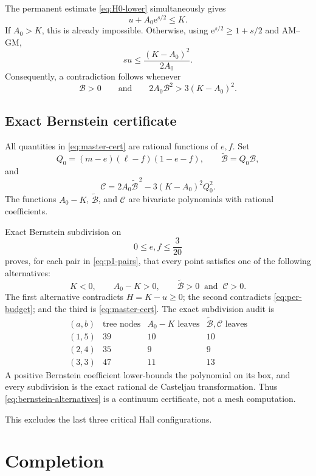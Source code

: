 \documentclass[11pt]{article}
\theoremstyle{definition}
\newcommand{\e}{\mathrm e}
\begin{document}
The permanent estimate \eqref{eq:H0-lower} simultaneously gives
\[
 u+A_0\e^{s/2}\le K.
 \tag{5.17}\label{eq:per-budget}
\]
If $A_0>K$, this is already impossible.  Otherwise, using $\e^{s/2}\ge1+s/2$ and AM--GM,
\[
 su\le\frac{(K-A_0)^2}{2A_0}.
 \tag{5.18}\label{eq:su-upper}
\]
Consequently, a contradiction follows whenever
\[
 \mathcal B>0
 \qquad\text{and}\qquad
 2A_0\mathcal B^2>3(K-A_0)^2.
 \tag{5.19}\label{eq:master-cert}
\]

\subsection{Exact Bernstein certificate}

All quantities in \eqref{eq:master-cert} are rational functions of $e,f$.  Set
\[
 Q_0=(m-e)(\ell-f)(1-e-f),
 \qquad
 \widetilde{\mathcal B}=Q_0\mathcal B,
\]
and
\[
 \mathcal C
 =2A_0\widetilde{\mathcal B}^{\,2}
 -3(K-A_0)^2Q_0^2.
 \tag{5.20}\label{eq:Cpoly}
\]
The functions $A_0-K$, $\widetilde{\mathcal B}$, and $\mathcal C$ are bivariate polynomials with rational coefficients.

Exact Bernstein subdivision on
\[
 0\le e,f\le\frac3{20}
\]
proves, for each pair in \eqref{eq:p1-pairs}, that every point satisfies one of the following alternatives:
\[
 K<0,
 \qquad A_0-K>0,
 \qquad
 \widetilde{\mathcal B}>0\ \text{ and }\ \mathcal C>0.
 \tag{5.21}\label{eq:bernstein-alternatives}
\]
The first alternative contradicts $H=K-u\ge0$; the second contradicts \eqref{eq:per-budget}; and the third is \eqref{eq:master-cert}.  The exact subdivision audit is
\[
\begin{array}{c|ccc}
 (a,b)&\text{tree nodes}&A_0-K\text{ leaves}&
 \widetilde{\mathcal B},\mathcal C\text{ leaves}\\ \hline
 (1,5)&39&10&10\\
 (2,4)&35&9&9\\
 (3,3)&47&11&13
\end{array}
\tag{5.22}\label{eq:bernstein-table}
\]
A positive Bernstein coefficient lower-bounds the polynomial on its box, and every subdivision is the exact rational de Casteljau transformation.  Thus \eqref{eq:bernstein-alternatives} is a continuum certificate, not a mesh computation.

This excludes the last three critical Hall configurations.

\section{Completion}
\end{document}

